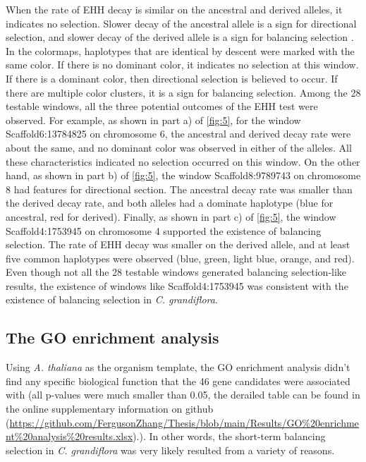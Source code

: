 When the rate of EHH decay is similar on the ancestral and derived alleles, it indicates no selection. Slower decay of the ancestral allele is a sign for directional selection, and slower decay of the derived allele is a sign for balancing selection \citep{RN14}. In the colormaps, haplotypes that are identical by descent were marked with the same color. If there is no dominant color, it indicates no selection at this window. If there is a dominant color, then directional selection is believed to occur. If there are multiple color clusters, it is a sign for balancing selection. Among the 28 testable windows, all the three potential outcomes of the EHH test were observed. For example, as shown in part a) of \cref{fig:5}, for the window Scaffold6:13784825 on chromosome 6, the ancestral and derived decay rate were about the same, and no dominant color was observed in either of the alleles. All these characteristics indicated no selection occurred on this window. On the other hand, as shown in part b) of \cref{fig:5}, the window Scaffold8:9789743 on chromosome 8 had features for directional section. The ancestral decay rate was smaller than the derived decay rate, and both alleles had a dominate haplotype (blue for ancestral, red for derived). Finally, as shown in part c) of \cref{fig:5}, the window Scaffold4:1753945 on chromosome 4 supported the existence of balancing selection. The rate of EHH decay was smaller on the derived allele, and at least five common haplotypes were observed (blue, green, light blue, orange, and red). Even though not all the 28 testable windows generated balancing selection-like results, the existence of windows like Scaffold4:1753945 was consistent with the existence of balancing selection in \emph{C. grandiflora}.

\subsection{The GO enrichment analysis}
Using \emph{A. thaliana} as the organism template, the GO enrichment analysis didn’t find any specific biological function that the 46 gene candidates were associated with (all p-values were much smaller than 0.05, the derailed table can be found in the online supplementary information on github (\url{https://github.com/FergusonZhang/Thesis/blob/main/Results/GO\%20enrichment\%20analysis\%20results.xlsx}).). In other words, the short-term balancing selection in \emph{C. grandiflora} was very likely resulted from a variety of reasons.


